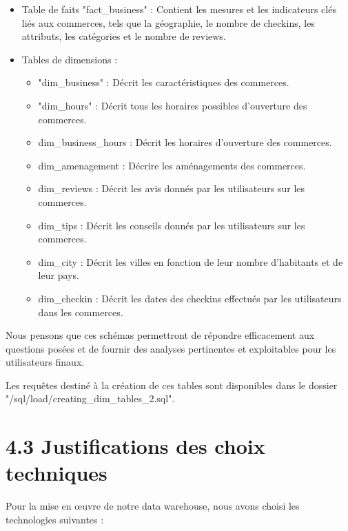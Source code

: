 \begin{itemize}
\item Table de faits "fact_business" : Contient les mesures et les indicateurs clés liés aux commerces, tels que la géographie, le nombre de checkins, les attributs, les catégories et le nombre de reviews.

\item Tables de dimensions :
\begin{itemize}
\item "dim_business" : Décrit les caractéristiques des commerces.
\item "dim_hours" : Décrit tous les horaires possibles d'ouverture des commerces.
\item dim_business_hours : Décrit les horaires d'ouverture des commerces.
\item dim_amenagement : Décrire les aménagements des commerces.
\item dim_reviews : Décrit les avis donnés par les utilisateurs sur les commerces.
\item dim_tips : Décrit les conseils donnés par les utilisateurs sur les commerces.
\item dim_city : Décrit les villes en fonction de leur nombre d'habitants et de leur pays.
\item dim_checkin : Décrit les dates des checkins effectués par les utilisateurs dans les commerces.
\end{itemize}

\end{itemize}

Nous pensons que ces schémas permettront de répondre efficacement aux questions posées et de fournir des analyses pertinentes et exploitables pour les utilisateurs finaux.

Les requêtes destiné à la création de ces tables sont disponibles dans le dossier "/sql/load/creating_dim_tables_2.sql".


\section*{4.3 Justifications des choix techniques}

Pour la mise en œuvre de notre data warehouse, nous avons choisi les technologies suivantes :

